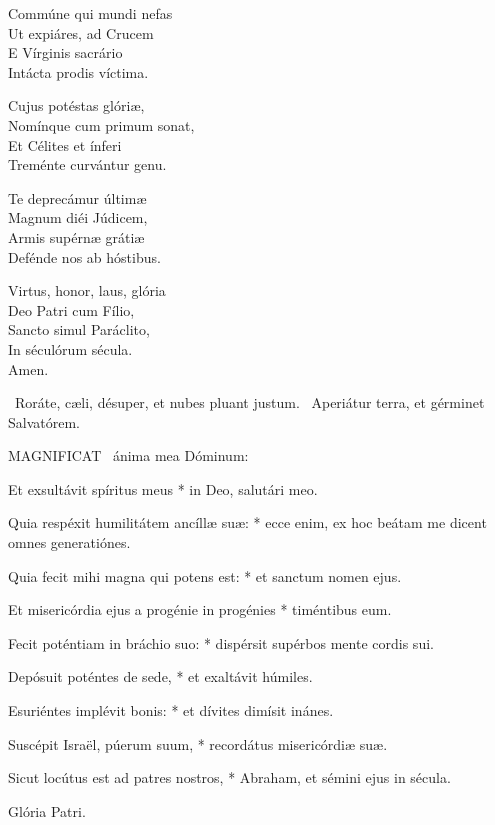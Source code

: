 Commúne qui mundi nefas\\
Ut expiáres, ad Crucem\\
E Vírginis sacrário\\
Intácta prodis víctima.

Cujus potéstas glóriæ,\\
Nomínque cum primum sonat,\\
Et Célites et ínferi\\
Treménte curvántur genu.

Te deprecámur últimæ\\
Magnum diéi Júdicem,\\
Armis supérnæ grátiæ\\
Defénde nos ab hóstibus.

Virtus, honor, laus, glória\\
Deo Patri cum Fílio,\\
Sancto simul Paráclito,\\
In séculórum sécula.\\
Amen.

\V\ Roráte, cæli, désuper, et nubes pluant justum. \R\ Aperiátur terra, et gérminet Salvatórem.



\lettrine[lines=2]{M}{AGNIFICAT} \textdagger\ ánima mea Dóminum:

Et exsultávit spíritus meus * in Deo, salutári meo.

Quia respéxit humilitátem ancíllæ suæ: * ecce enim, ex hoc beátam me dicent omnes generatiónes.

Quia fecit mihi magna qui potens est: * et sanctum nomen ejus.

Et misericórdia ejus a progénie in progénies * timéntibus eum.

Fecit poténtiam in bráchio suo: * dispérsit supérbos mente cordis sui.

Depósuit poténtes de sede, * et exaltávit húmiles.

Esuriéntes implévit bonis: * et dívites dimísit inánes.

Suscépit Israël, púerum suum, * recordátus misericórdiæ suæ.

Sicut locútus est ad patres nostros, * Abraham, et sémini ejus in sécula.

Glória Patri.


